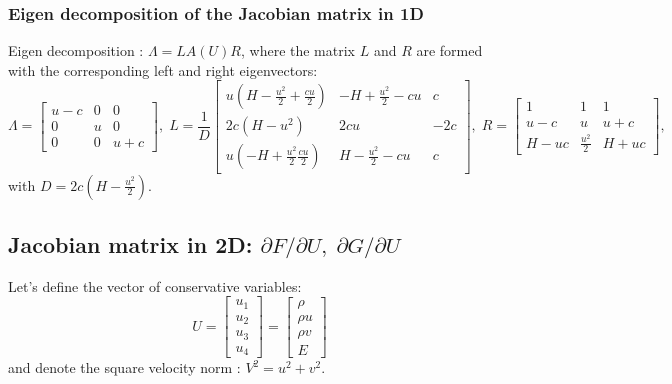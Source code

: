 \documentclass{article}
\begin{document}
\subsubsection{Eigen decomposition of the Jacobian matrix in 1D}

Eigen decomposition : $\Lambda = L A(U) R$, where the matrix $L$ and $R$ are formed with the corresponding left and right eigenvectors:
\begin{equation}
  \Lambda = \left[
    \begin{array}{ccc}
      u-c& 0 & 0\\
      0  & u & 0\\
      0  & 0 & u+c
    \end{array}
  \right],\;
  L=\frac{1}{D}\left[
    \begin{array}{ccc}
      u(H-\frac{u^2}{2}+\frac{cu}{2}) & -H+\frac{u^2}{2}-cu & c\\
      2c(H-u^2) & 2cu & -2c\\
      u(-H+\frac{u^2}{2}\frac{cu}{2}) & H-\frac{u^2}{2}-cu & c
    \end{array}
  \right],\;
  R=\left[
    \begin{array}{ccc}
      1    & 1             & 1\\
      u-c  & u             & u+c\\
      H-uc & \frac{u^2}{2} & H+uc
    \end{array}
  \right],
\end{equation}
with $D=2 c(H-\frac{u^2}{2})$.


\subsection{Jacobian matrix in 2D: \boldmath $\partial F/\partial U, \; \partial G/\partial U$}

Let's define the vector of conservative variables:
\begin{equation}
  U = \left[
    \begin{array}{c}
      u_1\\
      u_2\\
      u_3\\
      u_4
    \end{array}
  \right] = \left[
    \begin{array}{c}
      \rho\\
      \rho u\\
      \rho v\\
      E
    \end{array}
  \right]
\end{equation}
and denote the square velocity norm : $V^2=u^2+v^2$.
\end{document}
